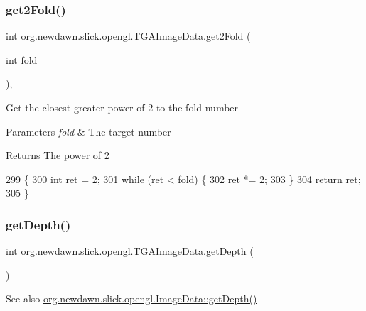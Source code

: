 \subsubsection{\texorpdfstring{get2\+Fold()}{get2Fold()}}
{\footnotesize\ttfamily int org.\+newdawn.\+slick.\+opengl.\+T\+G\+A\+Image\+Data.\+get2\+Fold (\begin{DoxyParamCaption}\item[{int}]{fold }\end{DoxyParamCaption})\hspace{0.3cm}{\ttfamily [inline]}, {\ttfamily [private]}}

Get the closest greater power of 2 to the fold number


\begin{DoxyParams}{Parameters}
{\em fold} & The target number \\
\hline
\end{DoxyParams}
\begin{DoxyReturn}{Returns}
The power of 2 
\end{DoxyReturn}

\begin{DoxyCode}
299                                    \{
300         \textcolor{keywordtype}{int} ret = 2;
301         \textcolor{keywordflow}{while} (ret < fold) \{
302             ret *= 2;
303         \}
304         \textcolor{keywordflow}{return} ret;
305     \}
\end{DoxyCode}
\mbox{\label{classorg_1_1newdawn_1_1slick_1_1opengl_1_1_t_g_a_image_data_abcda568d9272d044fe65b2bba9905731}} 
\subsubsection{\texorpdfstring{get\+Depth()}{getDepth()}}
{\footnotesize\ttfamily int org.\+newdawn.\+slick.\+opengl.\+T\+G\+A\+Image\+Data.\+get\+Depth (\begin{DoxyParamCaption}{ }\end{DoxyParamCaption})\hspace{0.3cm}{\ttfamily [inline]}}

\begin{DoxySeeAlso}{See also}
\mbox{\hyperlink{interfaceorg_1_1newdawn_1_1slick_1_1opengl_1_1_image_data_a69be40348e05222e8f0c65f5845adcb9}{org.\+newdawn.\+slick.\+opengl.\+Image\+Data\+::get\+Depth()}} 
\end{DoxySeeAlso}


